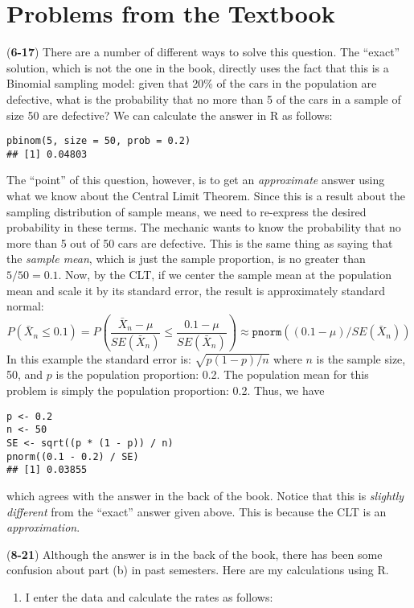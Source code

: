 \documentclass[addpoints,12pt]{exam}
\begin{document}
\section*{Problems from the Textbook}
\begin{questions}
  \item[]
  \begin{solution} (\textbf{6-17})
  There are a number of different ways to solve this question. The ``exact'' solution, which is not the one in the book, directly uses the fact that this is a Binomial sampling model: given that 20\% of the cars in the population are defective, what is the probability that no more than 5 of the cars in a sample of size 50 are defective? We can calculate the answer in R as follows:
\begin{verbatim}
pbinom(5, size = 50, prob = 0.2)
## [1] 0.04803
\end{verbatim}

The ``point'' of this question, however, is to get an \emph{approximate} answer using what we know about the Central Limit Theorem. Since this is a result about the sampling distribution of sample means, we need to re-express the desired probability in these terms. The mechanic wants to know the probability that no more than 5 out of 50 cars are defective. This is the same thing as saying that the \emph{sample mean}, which is just the sample proportion, is no greater than $5/50 = 0.1$. Now, by the CLT, if we center the sample mean at the population mean and scale it by its standard error, the result is approximately standard normal:
$$P(\bar{X}_n \leq 0.1) = P\left(\frac{\bar{X}_n - \mu}{SE(\bar{X}_n)} \leq \frac{0.1 - \mu}{SE(\bar{X}_n)} \right) \approx \texttt{pnorm}((0.1 - \mu)/SE(\bar{X}_n) )$$
In this example the standard error is: $\sqrt{p(1-p)/n}$ where $n$ is the sample size, 50, and $p$ is the population proportion: 0.2. The population mean for this problem is simply the population proportion: 0.2. Thus, we have
\begin{verbatim}
p <- 0.2
n <- 50
SE <- sqrt((p * (1 - p)) / n)
pnorm((0.1 - 0.2) / SE)
## [1] 0.03855
\end{verbatim}
which agrees with the answer in the back of the book. Notice that this is \emph{slightly different} from the ``exact'' answer given above. This is because the CLT is an \emph{approximation}. 
  \end{solution}
  
	\item[]
		\begin{solution} (\textbf{8-21}) Although the answer is in the back of the book, there has been some confusion about part (b) in past semesters. Here are my calculations using R. 
  \begin{enumerate}
    \item I enter the data and calculate the rates as follows:


\end{enumerate}
\end{solution}
\end{questions}
\end{document}
